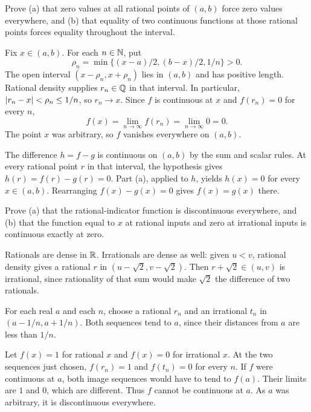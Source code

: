 \goal Prove (a) that zero values at all rational points of
$(a,b)$ force zero values everywhere, and (b) that equality of
two continuous functions at those rational points forces equality
throughout the interval.

Fix $x\in(a,b)$. For each $n\in\mathbb{N}$, put
\[
 \rho_n=\min\{(x-a)/2,(b-x)/2,1/n\}>0.
\]
The open interval $(x-\rho_n,x+\rho_n)$ lies in $(a,b)$
and has positive length. Rational density supplies
$r_n\in\mathbb{Q}$ in that interval. In particular,
$\left|r_n-x\right|<\rho_n\le1/n$, so $r_n\to x$.
Since $f$ is continuous at $x$ and $f(r_n)=0$ for every $n$,
\[
 f(x)=\lim_{n\to\infty}f(r_n)=\lim_{n\to\infty}0=0.
\]
The point $x$ was arbitrary, so $f$ vanishes everywhere on
$(a,b)$.

The difference $h=f-g$ is continuous on $(a,b)$ by the sum
and scalar rules. At every rational point $r$ in that interval,
the hypothesis gives $h(r)=f(r)-g(r)=0$.
Part (a), applied to $h$, yields $h(x)=0$ for every $x\in(a,b)$.
Rearranging $f(x)-g(x)=0$ gives $f(x)=g(x)$ there.

\goal Prove (a) that the rational-indicator function is
discontinuous everywhere, and (b) that the function equal to
$x$ at rational inputs and zero at irrational inputs is continuous
exactly at zero.

Rationals are dense in $\mathbb{R}$. Irrationals are dense as well:
given $u<v$, rational density gives a rational $r$ in
$(u-\sqrt2,v-\sqrt2)$. Then $r+\sqrt2\in(u,v)$ is
irrational, since rationality of that sum would make $\sqrt2$
the difference of two rationals.

For each real $a$ and each $n$, choose a rational $r_n$ and
an irrational $t_n$ in $(a-1/n,a+1/n)$. Both sequences tend
to $a$, since their distances from $a$ are less than $1/n$.

Let $f(x)=1$ for rational $x$ and $f(x)=0$ for irrational $x$.
At the two sequences just chosen,
$f(r_n)=1$ and $f(t_n)=0$ for every $n$.
If $f$ were continuous at $a$, both image sequences would have
to tend to $f(a)$. Their limits are $1$ and $0$, which are
different. Thus $f$ cannot be continuous at $a$.
As $a$ was arbitrary, it is discontinuous everywhere.

